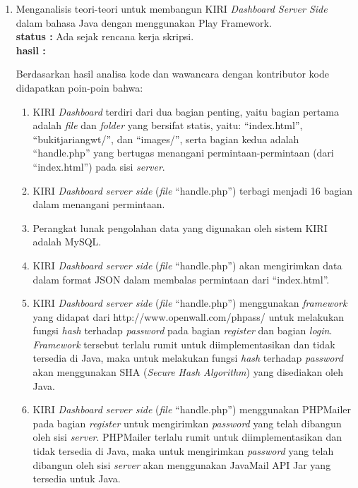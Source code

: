 \documentclass[a4paper,twoside]{article}
\begin{document}
\begin{enumerate}
\begin{itemize}
Berikut adalah contoh sebuah data JSON:
\begin{lstlisting}
	{
		"status":"error",
		"message":"Value of userid is expected but not found"
	}
\end{lstlisting}

Contoh kode di atas adalah sebuah objek (baris 1-4) yang memiliki 2 buah pasangan ``\texttt{nama:nilai}'' yang dipisahkan oleh karakter ``\texttt{,}'' (baris 2-3). Contoh di atas juga menggunakan \textit{string} sebagai nilainya (baris 2 dan 3).


		\end{itemize}

		\item Menganalisis teori-teori untuk membangun KIRI \textit{Dashboard Server Side} dalam bahasa Java dengan menggunakan Play Framework.\\
		{\bf status :} Ada sejak rencana kerja skripsi.\\
		{\bf hasil :}
		
Berdasarkan hasil analisa kode dan wawancara dengan kontributor kode didapatkan poin-poin bahwa:
\begin{enumerate}
	\item KIRI \textit{Dashboard} terdiri dari dua bagian penting, yaitu bagian pertama adalah \textit{file} dan \textit{folder} yang bersifat statis, yaitu: ``index.html'', ``bukitjariangwt/'', dan ``images/'', serta bagian kedua adalah ``handle.php'' yang bertugas menangani permintaan-permintaan (dari ``index.html'') pada sisi \textit{server}.
	\item KIRI \textit{Dashboard server side} (\textit{file} ``handle.php'') terbagi menjadi 16 bagian dalam menangani permintaan.
	\item Perangkat lunak pengolahan data yang digunakan oleh sistem KIRI adalah MySQL.
	\item KIRI \textit{Dashboard server side} (\textit{file} ``handle.php'') akan mengirimkan data dalam format JSON dalam membalas permintaan dari ``index.html''.
	\item KIRI \textit{Dashboard server side} (\textit{file} ``handle.php'') menggunakan \textit{framework} yang didapat dari http://www.openwall.com/phpass/ untuk melakukan fungsi \textit{hash} terhadap \textit{password} pada bagian \textit{register} dan bagian \textit{login}. \textit{Framework} tersebut terlalu rumit untuk diimplementasikan dan tidak tersedia di Java, maka untuk melakukan fungsi \textit{hash} terhadap \textit{password} akan menggunakan SHA (\textit{Secure Hash Algorithm}) yang disediakan oleh Java.
	\item KIRI \textit{Dashboard server side} (\textit{file} ``handle.php'') menggunakan PHPMailer pada bagian \textit{register} untuk mengirimkan \textit{password} yang telah dibangun oleh sisi \textit{server}. PHPMailer terlalu rumit untuk diimplementasikan dan tidak tersedia di Java, maka untuk mengirimkan \textit{password} yang telah dibangun oleh sisi \textit{server} akan menggunakan JavaMail API Jar yang tersedia untuk Java.
	

\end{enumerate}
\end{enumerate}
\end{document}
